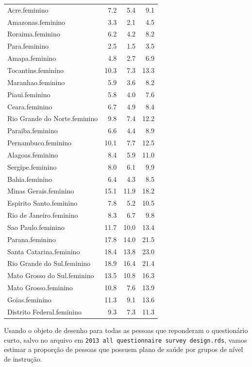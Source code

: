 \documentclass[]{book}
\numberwithin{example}{chapter}
\numberwithin{remark}{chapter}
\numberwithin{definition}{chapter}
\begin{document}
\begin{table}
\begin{tabular}[t]{lrrr}
Acre.feminino & 7.2 & 5.4 & 9.1\\
Amazonas.feminino & 3.3 & 2.1 & 4.5\\
\addlinespace
Roraima.feminino & 6.2 & 4.2 & 8.2\\
Para.feminino & 2.5 & 1.5 & 3.5\\
Amapa.feminino & 4.8 & 2.7 & 6.9\\
Tocantins.feminino & 10.3 & 7.3 & 13.3\\
Maranhao.feminino & 5.9 & 3.6 & 8.2\\
\addlinespace
Piaui.feminino & 5.8 & 4.0 & 7.6\\
Ceara.feminino & 6.7 & 4.9 & 8.4\\
Rio Grande do Norte.feminino & 9.8 & 7.4 & 12.2\\
Paraiba.feminino & 6.6 & 4.4 & 8.9\\
Pernambuco.feminino & 10.1 & 7.7 & 12.5\\
\addlinespace
Alagoas.feminino & 8.4 & 5.9 & 11.0\\
Sergipe.feminino & 8.0 & 6.1 & 9.9\\
Bahia.feminino & 6.4 & 4.3 & 8.5\\
Minas Gerais.feminino & 15.1 & 11.9 & 18.2\\
Espirito Santo.feminino & 7.8 & 5.2 & 10.5\\
\addlinespace
Rio de Janeiro.feminino & 8.3 & 6.7 & 9.8\\
Sao Paulo.feminino & 11.7 & 10.0 & 13.4\\
Parana.feminino & 17.8 & 14.0 & 21.5\\
Santa Catarina.feminino & 18.4 & 13.8 & 23.0\\
Rio Grande do Sul.feminino & 18.9 & 16.4 & 21.4\\
\addlinespace
Mato Grosso do Sul.feminino & 13.5 & 10.8 & 16.3\\
Mato Grosso.feminino & 10.8 & 7.6 & 13.9\\
Goias.feminino & 11.3 & 9.1 & 13.6\\
Distrito Federal.feminino & 9.3 & 7.3 & 11.3\\
\bottomrule
\end{tabular}
\end{table}

Usando o objeto de desenho para todas as pessoas que reponderam o
questionário curto, salvo no arquivo em
\texttt{2013\ all\ questionnaire\ survey\ design.rds}, vamos estimar a
proporção de pessoas que possuem plano de saúde por grupos de nível de
instrução.
\end{document}
